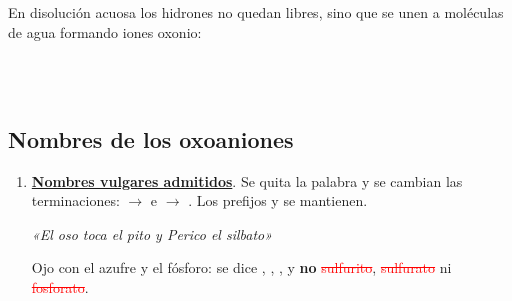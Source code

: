 \documentclass[12pt]{article}
\theoremstyle{mygreennumbox}
\newcommand{\mal}[1]{\textcolor{red}{\sout{#1}}}
\begin{document}
En disolución acuosa los hidrones no quedan libres, sino que se unen a moléculas de agua formando iones oxonio:
\begin{center}
    \\
    \\
\end{center}

\subsection{Nombres de los oxoaniones}

\begin{enumerate}[label=\numberballblue]
    \item \textbf{\uline{Nombres vulgares admitidos}}. Se quita la palabra  y se cambian las terminaciones:  \(\to\)  e  \(\to\) . Los prefijos  y  se mantienen.
          \begin{center}
              \textcolor{myOrange3}{\emph{«El oso toca el pito y Perico el silbato»}}
          \end{center}
          Ojo con el azufre y el fósforo: se dice , , , y \textbf{no} \mal{sulfurito}, \mal{sulfurato} ni \mal{fosforato}.


\end{enumerate}
\end{document}
